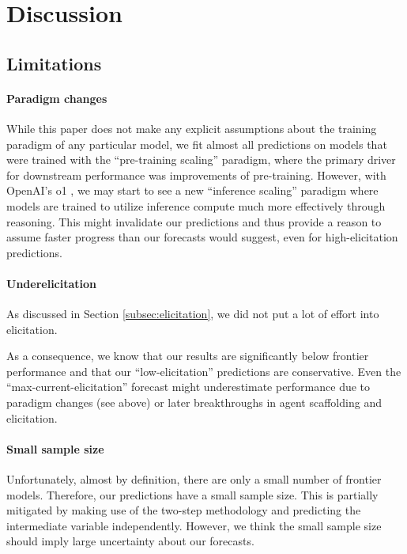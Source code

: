 \section{Discussion}
\label{sec:discussion}

\subsection{Limitations}
\label{sec:limitations}
%
\paragraph{Paradigm changes} 
While this paper does not make any explicit assumptions about the training paradigm of any particular model, we fit almost all predictions on models that were trained with the ``pre-training scaling'' paradigm, where the primary driver for downstream performance was improvements of pre-training. However, with OpenAI's o1 \citep{openai2024learningreasonllms}, we may start to see a new ``inference scaling'' paradigm where models are trained to utilize inference compute much more effectively through reasoning. This might invalidate our predictions and thus provide a reason to assume faster progress than our forecasts would suggest, even for high-elicitation predictions.
%
\paragraph{Underelicitation} 
As discussed in Section \ref{subsec:elicitation}, we did not put a lot of effort into elicitation.

As a consequence, we know that our results are significantly below frontier performance and that our ``low-elicitation'' predictions are conservative. Even the ``max-current-elicitation'' forecast might underestimate performance due to paradigm changes (see above) or later breakthroughs in agent scaffolding and elicitation.
%
\paragraph{Small sample size} 
Unfortunately, almost by definition, there are only a small number of frontier models. Therefore, our predictions have a small sample size. This is partially mitigated by making use of the two-step methodology and predicting the intermediate variable independently. However, we think the small sample size should imply large uncertainty about our forecasts. 

